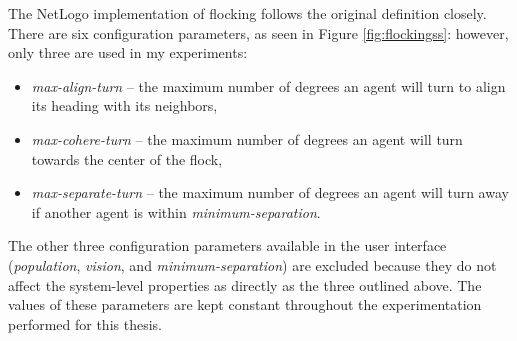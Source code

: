The NetLogo implementation of flocking follows the original definition closely.
There are six configuration parameters, as seen in Figure \ref{fig:flockingss}: however, only three are used in my experiments:
\begin{itemize}
\item \textit{max-align-turn} -- the maximum number of degrees an agent will turn to align its heading with its neighbors,
\item \textit{max-cohere-turn} -- the maximum number of degrees an agent will turn towards the center of the flock,
\item \textit{max-separate-turn} -- the maximum number of degrees an agent will turn away if another agent is within \textit{minimum-separation}.
\end{itemize}
The other three configuration parameters available in the user interface (\textit{population}, \textit{vision}, and \textit{minimum-separation}) are excluded because they do not affect the system-level properties as directly as the three outlined above.
The values of these parameters are kept constant throughout the experimentation performed for this thesis.

